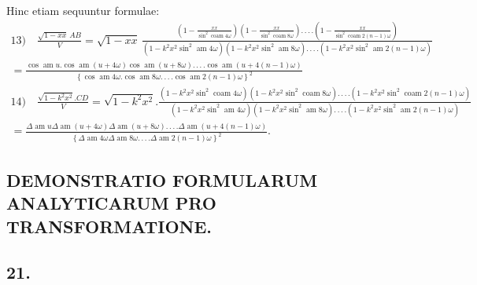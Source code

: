 \documentclass{article}
\begin{document}
Hinc etiam sequuntur formulae:
\[
\begin{gathered}
\text{13)}\quad\frac{\sqrt{1-xx}\,AB}{V}=\sqrt{1-xx}\,\frac{\left(1-\frac{xx}{\sin^{2}\operatorname{coam}4\omega}\right)\left(1-\frac{xx}{\sin^{2}\operatorname{coam}8\omega}\right).\,.\,.\,.\left(1-\frac{xx}{\sin^{2}\operatorname{coam}2(n-1)\omega}\right)}{\left(1-k^{2}x^{2}\sin^{2}\operatorname{am}4\omega\right)\left(1-k^{2}x^{2}\sin^{2}\operatorname{am}8\omega\right).\,.\,.\,.\left(1-k^{2}x^{2}\sin^{2}\operatorname{am}2(n-1)\omega\right)}\\[1.5ex]
=\frac{\cos\operatorname{am}u.\cos\operatorname{am}(u+4\omega)\cos\operatorname{am}(u+8\omega).\,.\,.\,.\cos\operatorname{am}(u+4(n-1)\omega)}{\left\{\cos\operatorname{am}4\omega.\cos\operatorname{am}8\omega.\,.\,.\,.\cos\operatorname{am}2(n-1)\omega\right\}^{2}}
\end{gathered}
\]
\[
\begin{gathered}
\text{14)}\quad\frac{\sqrt{1-k^{2}x^{2}}.CD}{V}=\sqrt{1-k^{2}x^{2}}.\frac{\left(1-k^{2}x^{2}\sin^{2}\operatorname{coam}4\omega\right)\left(1-k^{2}x^{2}\sin^{2}\operatorname{coam}8\omega\right).\,.\,.\,.\left(1-k^{2}x^{2}\sin^{2}\operatorname{coam}2(n-1)\omega\right)}{\left(1-k^{2}x^{2}\sin^{2}\operatorname{am}4\omega\right)\left(1-k^{2}x^{2}\sin^{2}\operatorname{am}8\omega\right).\,.\,.\,.\left(1-k^{2}x^{2}\sin^{2}\operatorname{am}2(n-1)\omega\right)}\\[1.5ex]
=\frac{\Delta\operatorname{am}u\Delta\operatorname{am}(u+4\omega)\Delta\operatorname{am}(u+8\omega).\,.\,.\,.\Delta\operatorname{am}(u+4(n-1)\omega)}{\left\{\Delta\operatorname{am}4\omega\Delta\operatorname{am}8\omega.\,.\,.\,.\Delta\operatorname{am}2(n-1)\omega\right\}^{2}}.
\end{gathered}
\]

\subsection*{DEMONSTRATIO FORMULARUM ANALYTICARUM PRO TRANSFORMATIONE.}

\subsection*{21.}
\end{document}
